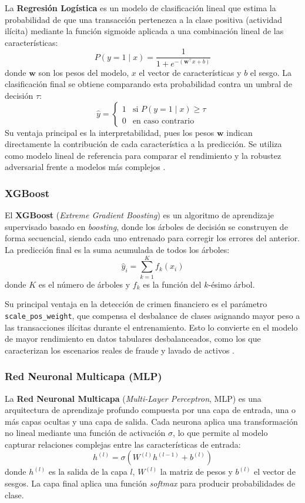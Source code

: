 La \textbf{Regresión Logística} es un modelo de clasificación lineal que estima la probabilidad de que una transacción pertenezca a la clase positiva (actividad ilícita) mediante la función sigmoide aplicada a una combinación lineal de las características:
$$
P(y=1 \mid x) = \frac{1}{1 + e^{-(\mathbf{w}^\top x + b)}}
$$
donde $\mathbf{w}$ son los pesos del modelo, $x$ el vector de características y $b$ el sesgo. La clasificación final se obtiene comparando esta probabilidad contra un umbral de decisión $\tau$:
$$
\hat{y} = \begin{cases} 1 & \text{si } P(y=1 \mid x) \geq \tau \\ 0 & \text{en caso contrario} \end{cases}
$$
Su ventaja principal es la interpretabilidad, pues los pesos $\mathbf{w}$ indican directamente la contribución de cada característica a la predicción. Se utiliza como modelo lineal de referencia para comparar el rendimiento y la robustez adversarial frente a modelos más complejos \cite{hosmer2013logistic}.

\subsubsection{XGBoost}

El \textbf{XGBoost} (\textit{Extreme Gradient Boosting}) es un algoritmo de aprendizaje supervisado basado en \textit{boosting}, donde los árboles de decisión se construyen de forma secuencial, siendo cada uno entrenado para corregir los errores del anterior. La predicción final es la suma acumulada de todos los árboles:
$$
\hat{y}_i = \sum_{k=1}^{K} f_k(x_i)
$$
donde $K$ es el número de árboles y $f_k$ es la función del $k$-ésimo árbol.

Su principal ventaja en la detección de crimen financiero es el parámetro \texttt{scale\_pos\_weight}, que compensa el desbalance de clases asignando mayor peso a las transacciones ilícitas durante el entrenamiento. Esto lo convierte en el modelo de mayor rendimiento en datos tabulares desbalanceados, como los que caracterizan los escenarios reales de fraude y lavado de activos \cite{chen2016xgboost}.

\subsubsection{Red Neuronal Multicapa (MLP)}

La \textbf{Red Neuronal Multicapa} (\textit{Multi-Layer Perceptron}, MLP) es una arquitectura de aprendizaje profundo compuesta por una capa de entrada, una o más capas ocultas y una capa de salida. Cada neurona aplica una transformación no lineal mediante una función de activación $\sigma$, lo que permite al modelo capturar relaciones complejas entre las características de entrada:
$$
h^{(l)} = \sigma\left(W^{(l)} h^{(l-1)} + b^{(l)}\right)
$$
donde $h^{(l)}$ es la salida de la capa $l$, $W^{(l)}$ la matriz de pesos y $b^{(l)}$ el vector de sesgos. La capa final aplica una función \textit{softmax} para producir probabilidades de clase.

